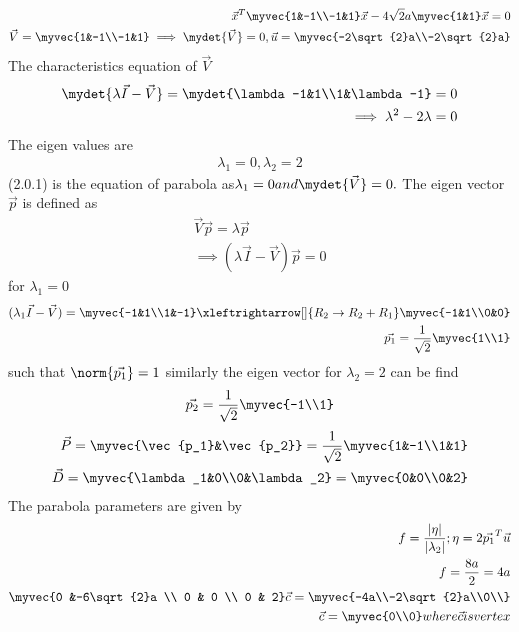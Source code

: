\begin{align}
\vec{x}^T\myvec{1&-1\\-1&1}\vec{x}-4\sqrt{2}a\myvec{1&1}\vec{x}=0\\
\vec{V}=\myvec{1&-1\\-1&1}\implies\mydet{\vec{V}}=0,\vec{u}=\myvec{-2\sqrt{2}a\\-2\sqrt{2}a}
\end{align}
The characteristics equation of $\vec{V}$
\begin{align}
\mydet{\lambda\vec{I}-\vec{V}}=\mydet{\lambda-1&1\\1&\lambda-1}=0\\
\implies\lambda^{2}-2\lambda=0
\end{align}
The eigen values are
\begin{align}
  \lambda{_1}=0,\lambda{_2} =2
\end{align}
(2.0.1) is the equation of parabola as$\lambda{_1}=0 and \mydet{\vec{V}}=0.$ 
The eigen vector $\vec{p}$ is defined as
\begin{align}
    \vec{V}\vec{p}=\lambda{\vec{p}}\\
    \implies(\lambda{\vec{I}}-\vec{V})\vec{p}=0
\end{align}
for $\lambda{_1}=0$
\begin{align}
(\lambda{_1}\vec{I}-\vec{V})= \myvec{-1&1\\1&-1}\xleftrightarrow[]{R_2\rightarrow{R_2+R_1}}\myvec{-1&1\\0&0}\\\vec{p_1}=\frac{1}{\sqrt{2}}\myvec{1\\1}
\end{align}
such that $\norm{\vec{p_1}}=1$ similarly the eigen vector for $\lambda{_2}=2$ can be find
\begin{align}
    \vec{p_2}=\frac{1}{\sqrt{2}}\myvec{-1\\1}
\end{align}
\begin{align}
\vec{P}=\myvec{\vec{p_1}&\vec{p_2}}=\frac{1}{\sqrt{2}}\myvec{1&-1\\1&1}\\
\vec{D}=\myvec{\lambda_1&0\\0&\lambda_2}=\myvec{0&0\\0&2}
\end{align}
The parabola parameters are given by
\begin{align}
    f=\frac{|\eta|}{|\lambda{_2}|} ; \eta=2\vec{p_1}^T\vec{u}\\
    f= \frac{8a}{2}=4a\\
    \myvec{0 &-6\sqrt{2}a \\ 0 & 0 \\ 0 & 2}\vec{c}=\myvec{-4a\\-2\sqrt{2}a\\0\\}\\
    \vec{c}=\myvec{0\\0} where \vec{c} is vertex
\end{align}
